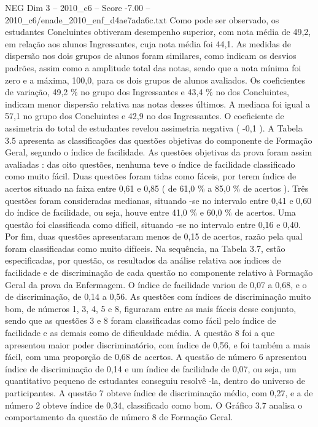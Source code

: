 \begin{textsample}{NEG Dim 3 – 2010\_c6 – Score -7.00 – 2010\_c6/enade\_2010\_enf\_d4ae7ada6c.txt}
Como pode ser observado, os estudantes Concluintes obtiveram desempenho superior, com nota média de 49,2, em relação aos alunos Ingressantes, cuja nota média foi 44,1.
As medidas de dispersão nos dois grupos de alunos foram similares, como indicam os desvios padrões, assim como a amplitude total das notas, sendo que a nota mínima foi zero e a máxima, 100,0, para os dois grupos de alunos avaliados.
Os coeficientes de variação, 49,2 \% no grupo dos Ingressantes e 43,4 \% no dos Concluintes, indicam menor dispersão relativa nas notas desses últimos.
A mediana foi igual a 57,1 no grupo dos Concluintes e 42,9 no dos Ingressantes.
O coeficiente de assimetria do total de estudantes revelou assimetria negativa ( -0,1 ).
A Tabela 3.5 apresenta as classificações das questões objetivas do componente de Formação Geral, segundo o índice de facilidade.
As questões objetivas da prova foram assim avaliadas : das oito questões, nenhuma teve o índice de facilidade classificado como muito fácil.
Duas questões foram tidas como fáceis, por terem índice de acertos situado na faixa entre 0,61 e 0,85 ( de 61,0 \% a 85,0 \% de acertos ).
Três questões foram consideradas medianas, situando -se no intervalo entre 0,41 e 0,60 do índice de facilidade, ou seja, houve entre 41,0 \% e 60,0 \% de acertos.
Uma questão foi classificada como difícil, situando -se no intervalo entre 0,16 e 0,40.
Por fim, duas questões apresentaram menos de 0,15 de acertos, razão pela qual foram classificadas como muito difíceis.
Na sequência, na Tabela 3.7, estão especificadas, por questão, os resultados da análise relativa aos índices de facilidade e de discriminação de cada questão no componente relativo à Formação Geral da prova da Enfermagem.
O índice de facilidade variou de 0,07 a 0,68, e o de discriminação, de 0,14 a 0,56.
As questões com índices de discriminação muito bom, de números 1, 3, 4, 5 e 8, figuraram entre as mais fáceis desse conjunto, sendo que as questões 3 e 8 foram classificadas como fácil pelo índice de facilidade e as demais como de dificuldade média.
A questão 8 foi a que apresentou maior poder discriminatório, com índice de 0,56, e foi também a mais fácil, com uma proporção de 0,68 de acertos.
A questão de número 6 apresentou índice de discriminação de 0,14 e um índice de facilidade de 0,07, ou seja, um quantitativo pequeno de estudantes conseguiu resolvê -la, dentro do universo de participantes.
A questão 7 obteve índice de discriminação médio, com 0,27, e a de número 2 obteve índice de 0,34, classificado como bom.
O Gráfico 3.7 analisa o comportamento da questão de número 8 de Formação Geral.

\end{textsample}
